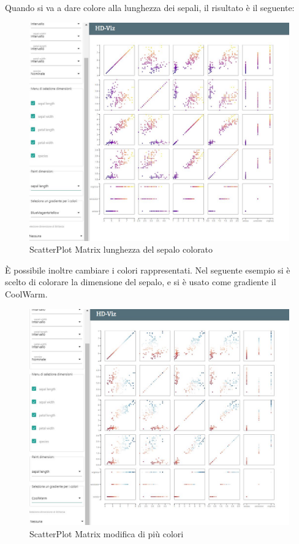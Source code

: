 \documentclass[../manuale_utente.tex]{subfiles}
\begin{document}
Quando si va a dare colore alla lunghezza dei sepali, il risultato è il seguente:

\begin{figure}[H]
	\centering
	\includegraphics[width=18cm]{src/img/spm/spm_colore_dimensione_sepal.jpg}
	\caption{ScatterPlot Matrix lunghezza del sepalo colorato}
\end{figure}

È possibile inoltre cambiare i colori rappresentati. Nel seguente esempio si è scelto di colorare la dimensione del sepalo, e si è usato come gradiente il CoolWarm.

\begin{figure}[H]
	\centering
	\includegraphics[width=18cm]{src/img/spm/spm_mix_colori.jpg}
	\caption{ScatterPlot Matrix modifica di più colori}
\end{figure}
\end{document}

